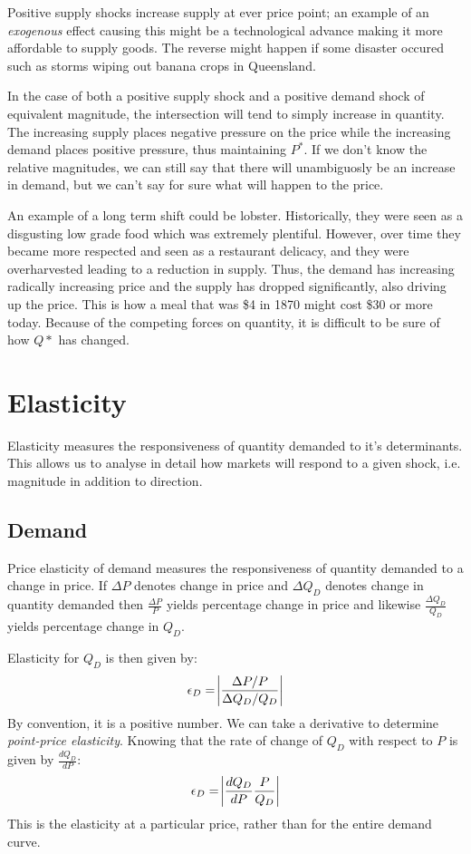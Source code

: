 \documentclass[12pt]{report}
\begin{document}
\begin{flushleft}
\bigskip
Positive supply shocks increase supply at ever price point; an example of an \textit{exogenous} effect
causing this might be a technological advance making it more affordable to supply goods. The 
reverse might happen if some disaster occured such as storms wiping out banana crops in Queensland.

\bigskip
In the case of both a positive supply shock and a positive demand shock of equivalent magnitude,
the intersection will tend to simply increase in quantity. The increasing supply places negative pressure on the price while the increasing
demand places positive pressure, thus maintaining \(P^*\). If we don't know the relative magnitudes,
we can still say that there will unambiguosly be an increase in demand, but we can't say for sure
what will happen to the price.

\bigskip
An example of a long term shift could be lobster. Historically, they were seen as a disgusting low
grade food which was extremely plentiful. However, over time they became more respected and seen
 as a restaurant delicacy, and they were overharvested leading to a reduction in supply.
 Thus, the demand has increasing radically increasing price and the supply has dropped significantly,
 also driving up the price. This is how a meal that was \$4 in 1870 might cost \$30 or more today.
Because of the competing forces on quantity, it is difficult to be sure of how \(Q*\) has changed.

\section*{Elasticity}

Elasticity measures the responsiveness of quantity demanded to it's determinants. This allows us
to analyse in detail how markets will respond to a given shock, i.e. magnitude in addition to direction.

\subsection*{Demand}

Price elasticity of demand measures the responsiveness of quantity demanded to a change in price. If
\(\Delta P\) denotes change in price and \(\Delta Q_D\) denotes change in quantity demanded then 
\(\frac{\Delta P}{P}\) yields percentage change in price and likewise \(\frac{\Delta Q_D}{Q_D}\) yields
percentage change in \(Q_D\).

\bigskip
Elasticity for \(Q_D\) is then given by:
\[\epsilon_D = \abs{\frac{\Delta P / P}{\Delta Q_D / Q_D}}\]
By convention, it is a positive number. We can take a derivative to determine
\textit{point-price elasticity}. Knowing that the rate of change of \(Q_D\) with
respect to \(P\) is given by \(\frac{dQ_D}{dP}\):
\[\epsilon_D = \abs{\frac{dQ_D}{dP}\frac{P}{Q_D}}\]
This is the elasticity at a particular price, rather than for the entire demand curve.


\end{flushleft}
\end{document}
